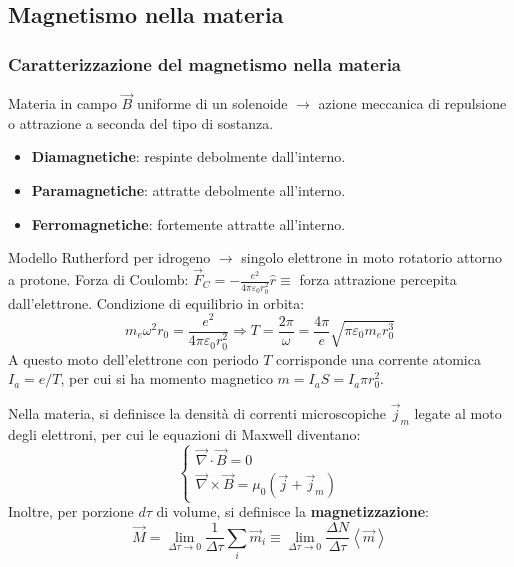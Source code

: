 \documentclass[a4paper]{scrartcl}
\numberwithin{equation}{subsection}
\theoremstyle{style1}
\begin{document}
\subsection{Magnetismo nella materia}

\subsubsection{Caratterizzazione del magnetismo nella materia}

Materia in campo $\vec{B}$ uniforme di un solenoide $\to$ azione meccanica di repulsione o attrazione a seconda del tipo di sostanza.
\begin{itemize}
	\item \textbf{Diamagnetiche}: respinte debolmente dall'interno.
	\item \textbf{Paramagnetiche}: attratte debolmente all'interno.
	\item \textbf{Ferromagnetiche}: fortemente attratte all'interno.
\end{itemize}
Modello Rutherford per idrogeno $\to$ singolo elettrone in moto rotatorio attorno a protone. Forza di Coulomb: $\vec{F}_C = -\frac{e^2}{4\pi \varepsilon _0 r_0^2}\hat{r}\equiv$ forza attrazione percepita dall'elettrone. Condizione di equilibrio in orbita:
\[
m_e \omega^2 r_0 = \frac{e^2}{4\pi \varepsilon _0 r_0^2} \Rightarrow T = \frac{2\pi}{\omega}=\frac{4\pi}{e}\sqrt{\pi \varepsilon _0 m_e r_0^3} 
\] 
A questo moto dell'elettrone con periodo $T$ corrisponde una corrente atomica $I_a = e / T$, per cui si ha momento magnetico $m = I_a S = I_a \pi r_0^2$.

Nella materia, si definisce la densit\`a di correnti microscopiche $\vec{j}_m$ legate al moto degli elettroni, per cui le equazioni di Maxwell diventano:
\begin{equation}
	\begin{cases}
		\vec{\nabla }\cdot \vec{B}=0\\
		\vec{\nabla }\times \vec{B} = \mu_0 (\vec{j}+\vec{j}_m)
	\end{cases}
\end{equation}
Inoltre, per porzione $d\tau $ di volume, si definisce la \textbf{magnetizzazione}:
\begin{equation}
	\vec{M} = \lim_{\Delta \tau  \to 0} \frac{1}{\Delta \tau }\sum_{i}^{} \vec{m}_i \equiv \lim_{\Delta \tau  \to 0} \frac{\Delta N}{\Delta \tau }\left\langle \vec{m} \right\rangle
\end{equation}
\end{document}
